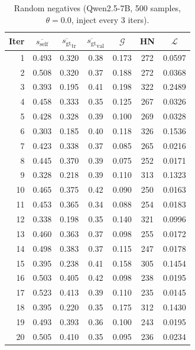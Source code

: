 \documentclass{article}
\newcommand{\gap}{\mathcal{G}}          %
\newcommand{\self}{s_{\text{self}}}     %
\newcommand{\gt}{s_{\text{gt}}}         %
\begin{document}
\begin{table}[h]
\centering
\caption{Random negatives (Qwen2.5-7B, 500 samples, $\theta{=}0.0$, inject every 3 iters).}
\label{tab:app-random-neg}
\small
\begin{tabular}{rcccccc}
\toprule
Iter & $\overline{\self}$ & $\overline{\gt}_\text{tr}$ & $\overline{\gt}_\text{val}$ & $\gap$ & HN & $\mathcal{L}$ \\
\midrule
1  & 0.493 & 0.320 & 0.38 & 0.173 & 272 & 0.0597 \\
2  & 0.508 & 0.320 & 0.37 & 0.188 & 272 & 0.0368 \\
3  & 0.393 & 0.195 & 0.41 & 0.198 & 322 & 0.2489 \\
4  & 0.458 & 0.333 & 0.35 & 0.125 & 267 & 0.0326 \\
5  & 0.428 & 0.328 & 0.39 & 0.100 & 269 & 0.0328 \\
6  & 0.303 & 0.185 & 0.40 & 0.118 & 326 & 0.1536 \\
7  & 0.423 & 0.338 & 0.37 & 0.085 & 265 & 0.0216 \\
8  & 0.445 & 0.370 & 0.39 & 0.075 & 252 & 0.0171 \\
9  & 0.328 & 0.218 & 0.39 & 0.110 & 313 & 0.1323 \\
10 & 0.465 & 0.375 & 0.42 & 0.090 & 250 & 0.0163 \\
11 & 0.453 & 0.365 & 0.34 & 0.088 & 254 & 0.0183 \\
12 & 0.338 & 0.198 & 0.35 & 0.140 & 321 & 0.0996 \\
13 & 0.460 & 0.363 & 0.37 & 0.098 & 255 & 0.0172 \\
14 & 0.498 & 0.383 & 0.37 & 0.115 & 247 & 0.0178 \\
15 & 0.395 & 0.238 & 0.41 & 0.158 & 305 & 0.1454 \\
16 & 0.503 & 0.405 & 0.42 & 0.098 & 238 & 0.0195 \\
17 & 0.523 & 0.413 & 0.39 & 0.110 & 235 & 0.0145 \\
18 & 0.395 & 0.220 & 0.35 & 0.175 & 312 & 0.1430 \\
19 & 0.493 & 0.393 & 0.36 & 0.100 & 243 & 0.0195 \\
20 & 0.505 & 0.410 & 0.35 & 0.095 & 236 & 0.0234 \\
\bottomrule
\end{tabular}
\end{table}
\end{document}
